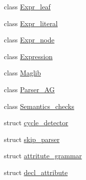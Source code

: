 \begin{DoxyCompactItemize}
\item 
class \hyperlink{classgenevalmag_1_1Expr__leaf}{Expr\_\-leaf}
\item 
class \hyperlink{classgenevalmag_1_1Expr__literal}{Expr\_\-literal}
\item 
class \hyperlink{classgenevalmag_1_1Expr__node}{Expr\_\-node}
\item 
class \hyperlink{classgenevalmag_1_1Expression}{Expression}
\item 
class \hyperlink{classgenevalmag_1_1Maglib}{Maglib}
\item 
class \hyperlink{classgenevalmag_1_1Parser__AG}{Parser\_\-AG}
\item 
class \hyperlink{classgenevalmag_1_1Semantics__checks}{Semantics\_\-checks}
\item 
struct \hyperlink{structgenevalmag_1_1cycle__detector}{cycle\_\-detector}
\item 
struct \hyperlink{structgenevalmag_1_1skip__parser}{skip\_\-parser}
\item 
struct \hyperlink{structgenevalmag_1_1attritute__grammar}{attritute\_\-grammar}
\item 
struct \hyperlink{structgenevalmag_1_1decl__attribute}{decl\_\-attribute}
\end{DoxyCompactItemize}
